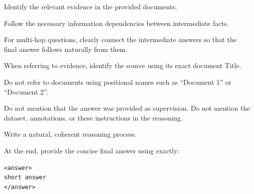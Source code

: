 \begin{frame}[t]
    Identify the relevant evidence in the provided documents.

    Follow the necessary information dependencies between
    intermediate facts.

    For multi-hop questions, clearly connect the intermediate
    answers so that the final answer follows naturally from them.

    When referring to evidence, identify the source using its exact
    document Title.

    Do not refer to documents using positional names such as
    ``Document 1'' or ``Document 2''.

    Do not mention that the answer was provided as supervision.
    Do not mention the dataset, annotations, or these instructions
    in the reasoning.

    Write a natural, coherent reasoning process.

    At the end, provide the concise final answer using exactly:

    \begin{center}
        \texttt{<answer>}\\
        \texttt{short answer}\\
        \texttt{</answer>}
    \end{center}

\end{frame}